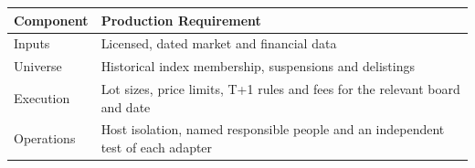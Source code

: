 \begin{tabular}{@{}P{3.0cm}P{9.5cm}@{}}
\toprule
\textbf{Component} & \textbf{Production Requirement} \\
\midrule
Inputs & Licensed, dated market and financial data \\
Universe & Historical index membership, suspensions and delistings \\
Execution & Lot sizes, price limits, T+1 rules and fees for the relevant board and date \\
Operations & Host isolation, named responsible people and an independent test of each adapter \\
\bottomrule
\end{tabular}
